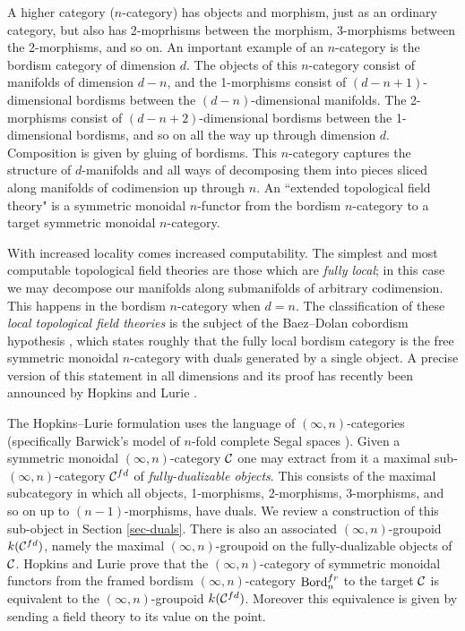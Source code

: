 \documentclass{amsart}
\begin{document}
A higher category ($n$-category) has objects and morphism, just as an ordinary category, but also has 2-moprhisms between the morphism, 3-morphisms between the 2-morphisms, and so on. An important example of an $n$-category is the bordism category of dimension $d$. The objects of this $n$-category consist of manifolds of dimension $d-n$, and the 1-morphisms consist of $(d-n +1)$-dimensional bordisms between the $(d-n)$-dimensional manifolds. The 2-morphisms consist of $(d-n +2)$-dimensional bordisms between the 1-dimensional bordisms, and so on all the way up through dimension $d$. Composition is given by gluing of bordisms. 
This $n$-category captures the structure of $d$-manifolds and all ways of decomposing them into pieces sliced along manifolds of codimension up through $n$. An ``extended  topological field theory" is a symmetric monoidal $n$-functor from the bordism $n$-category to a target symmetric monoidal $n$-category. 

With increased locality comes increased computability. The simplest and most computable topological field theories are those which are {\em fully local}; in this case we may decompose our manifolds along submanifolds of arbitrary codimension. This happens in the bordism $n$-category when $d=n$. The classification of these {\em local topological field theories} is the subject of the Baez--Dolan cobordism hypothesis \cite{MR1355899}, which states roughly that the fully local bordism category is the free symmetric monoidal $n$-category with duals generated by a single object. A precise version of this statement in all dimensions and its proof has recently been announced by Hopkins and Lurie \cite{MR2555928}.

The Hopkins--Lurie formulation uses the language of $(\infty, n)$-categories (specifically Barwick's model of $n$-fold complete Segal spaces \cite{Barwick:thesis}). Given a symmetric monoidal $(\infty, n)$-category $\mathcal C$ one may extract from it a maximal sub-$(\infty,n)$-category $\mathcal C^{fd}$ of {\em fully-dualizable objects}. This consists of the maximal subcategory in which  all objects, 1-morphisms, 2-morphisms, 3-morphisms, and so on up to $(n-1)$-morphisms, have duals. We review a construction of this sub-object in Section \ref{sec-duals}.  There is also an associated $(\infty,n)$-groupoid $k(\mathcal C^{fd})$, namely the maximal $(\infty,n)$-groupoid on the fully-dualizable objects of $\mathcal C$.  Hopkins and Lurie prove that the $(\infty,n)$-category of symmetric monoidal functors from the framed bordism $(\infty,n)$-category $\mathrm{Bord}^{fr}_n$ to the target $\mathcal C$ is equivalent to the $(\infty,n)$-groupoid $k(\mathcal C^{fd})$.  Moreover this equivalence is given by sending a field theory to its value on the point.
\end{document}
